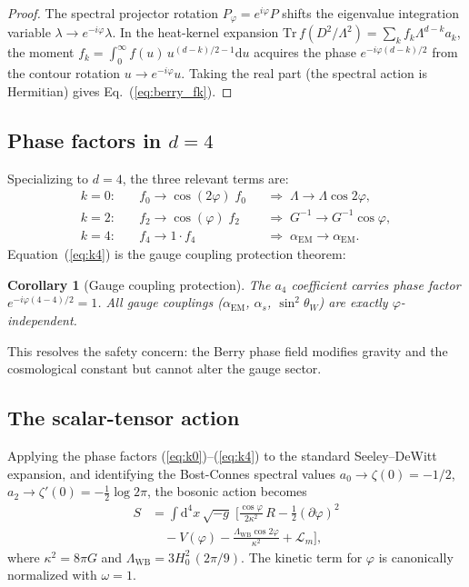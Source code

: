 \documentclass[aps,prd,twocolumn,superscriptaddress,nofootinbib]{revtex4-2}
\newcommand{\Tr}{\mathrm{Tr}}
\newcommand{\dd}{\mathrm{d}}
\newcommand{\Lw}{\Lambda_{\mathrm{WB}}}
\newtheorem{corollary}[theorem]{Corollary}
\begin{document}
\begin{proof}
The spectral projector rotation $P_\varphi = e^{i\varphi}P$
shifts the eigenvalue integration variable
$\lambda \to e^{-i\varphi}\lambda$.  In the heat-kernel
expansion $\Tr\,f(D^2/\Lambda^2) = \sum_k f_k\Lambda^{d-k}a_k$,
the moment $f_k = \int_0^\infty f(u)\,u^{(d-k)/2-1}\dd u$
acquires the phase $e^{-i\varphi(d-k)/2}$ from the
contour rotation $u \to e^{-i\varphi}u$.
Taking the real part (the spectral action is Hermitian)
gives Eq.~(\ref{eq:berry_fk}).
\end{proof}

\subsection{Phase factors in $d=4$}

Specializing to $d = 4$, the three relevant terms are:
\begin{align}
  k=0:\quad & f_0 \to \cos(2\varphi)\;f_0
  &&\Rightarrow\; \Lambda \to \Lambda\cos 2\varphi,
  \label{eq:k0} \\
  k=2:\quad & f_2 \to \cos(\varphi)\;f_2
  &&\Rightarrow\; G^{-1}\to G^{-1}\cos\varphi,
  \label{eq:k2} \\
  k=4:\quad & f_4 \to 1\cdot f_4
  &&\Rightarrow\; \alpha_{\mathrm{EM}}\to\alpha_{\mathrm{EM}}.
  \label{eq:k4}
\end{align}
%
Equation~(\ref{eq:k4}) is the gauge coupling protection theorem:

\begin{corollary}[Gauge coupling protection]
\label{cor:gauge}
The $a_4$ coefficient carries phase factor
$e^{-i\varphi(4-4)/2}=1$.
All gauge couplings ($\alpha_{\mathrm{EM}}$,
$\alpha_s$, $\sin^2\theta_W$) are exactly $\varphi$-independent.
\end{corollary}

This resolves the safety concern: the Berry phase field
modifies gravity and the cosmological constant but
cannot alter the gauge sector.

\subsection{The scalar-tensor action}

Applying the phase factors
(\ref{eq:k0})--(\ref{eq:k4}) to the
standard Seeley--DeWitt expansion,
and identifying the Bost-Connes spectral values
$a_0 \to \zeta(0) = -1/2$,
$a_2 \to \zeta'(0) = -\tfrac{1}{2}\log 2\pi$,
the bosonic action becomes
\begin{align}
  S &= \int \dd^4 x\,\sqrt{-g}\;
  \biggl[\frac{\cos\varphi}{2\kappa^2}\,R
  - \frac{1}{2}(\partial\varphi)^2
  \nonumber \\
  &\quad - V(\varphi)
  - \frac{\Lw\cos 2\varphi}{\kappa^2}
  + \mathcal{L}_m
  \biggr],
  \label{eq:action_jordan}
\end{align}
where $\kappa^2 = 8\pi G$ and $\Lw = 3H_0^2\,(2\pi/9)$.
The kinetic term for $\varphi$ is canonically normalized
with $\omega = 1$.
\end{document}
